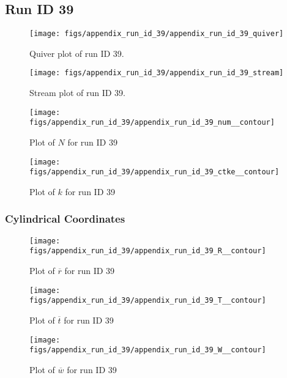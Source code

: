 \subsection{Run ID 39}
\begin{figure}[H]
\centering
\texttt{[image: figs/appendix\_run\_id\_39/appendix\_run\_id\_39\_quiver]}
\caption{Quiver plot of run ID 39.}
\label{fig:appendix_run_id_39_quiver}
\end{figure}


\begin{figure}[H]
\centering
\texttt{[image: figs/appendix\_run\_id\_39/appendix\_run\_id\_39\_stream]}
\caption{Stream plot of run ID 39.}
\label{fig:appendix_run_id_39_stream}
\end{figure}


\begin{figure}[H]
\centering
\texttt{[image: figs/appendix\_run\_id\_39/appendix\_run\_id\_39\_num\_\_contour]}
\caption{Plot of $N$ for run ID 39}
\label{fig:appendix_run_id_39_num__contour}
\end{figure}


\begin{figure}[H]
\centering
\texttt{[image: figs/appendix\_run\_id\_39/appendix\_run\_id\_39\_ctke\_\_contour]}
\caption{Plot of $k$ for run ID 39}
\label{fig:appendix_run_id_39_ctke__contour}
\end{figure}


\subsubsection{Cylindrical Coordinates}
\begin{figure}[H]
\centering
\texttt{[image: figs/appendix\_run\_id\_39/appendix\_run\_id\_39\_R\_\_contour]}
\caption{Plot of $\overline{r}$ for run ID 39}
\label{fig:appendix_run_id_39_R__contour}
\end{figure}


\begin{figure}[H]
\centering
\texttt{[image: figs/appendix\_run\_id\_39/appendix\_run\_id\_39\_T\_\_contour]}
\caption{Plot of $\overline{t}$ for run ID 39}
\label{fig:appendix_run_id_39_T__contour}
\end{figure}


\begin{figure}[H]
\centering
\texttt{[image: figs/appendix\_run\_id\_39/appendix\_run\_id\_39\_W\_\_contour]}
\caption{Plot of $\overline{w}$ for run ID 39}
\label{fig:appendix_run_id_39_W__contour}
\end{figure}


